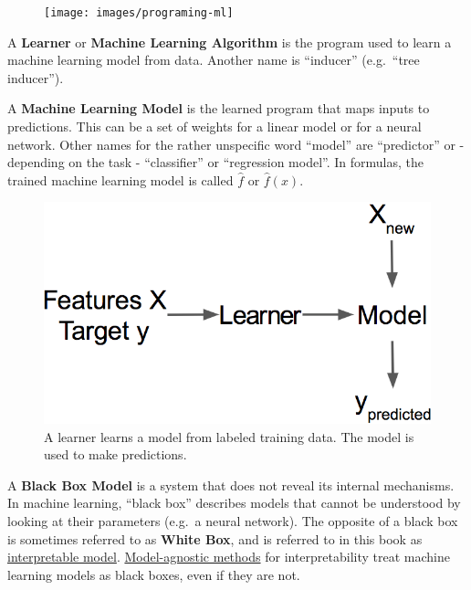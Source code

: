 \documentclass[
  12pt,
]{krantz}
\begin{document}
\begin{figure}

{\centering \texttt{[image: images/programing-ml]} 

}

\end{figure}

A \textbf{Learner} or \textbf{Machine Learning Algorithm} is the program used to learn a machine learning model from data.
Another name is ``inducer'' (e.g.~``tree inducer'').

A \textbf{Machine Learning Model} is the learned program that maps inputs to predictions.
This can be a set of weights for a linear model or for a neural network.
Other names for the rather unspecific word ``model'' are ``predictor'' or - depending on the task - ``classifier'' or ``regression model''.
In formulas, the trained machine learning model is called \(\hat{f}\) or \(\hat{f}(x)\).

\begin{figure}

{\centering \includegraphics[width=\textwidth]{images/learner} 

}

\caption{A learner learns a model from labeled training data. The model is used to make predictions.}\label{fig:learner-definition}
\end{figure}

A \textbf{Black Box Model} is a system that does not reveal its internal mechanisms.
In machine learning, ``black box'' describes models that cannot be understood by looking at their parameters (e.g.~a neural network).
The opposite of a black box is sometimes referred to as \textbf{White Box}, and is referred to in this book as \protect\hyperlink{simple}{interpretable model}.
\protect\hyperlink{agnostic}{Model-agnostic methods} for interpretability treat machine learning models as black boxes, even if they are not.
\end{document}
